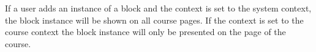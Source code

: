 If a user adds an instance of a block and the context is set to the system context, the block instance will be shown on all course pages.
If the context is set to the course context the block instance will only be presented on the page of the course.

